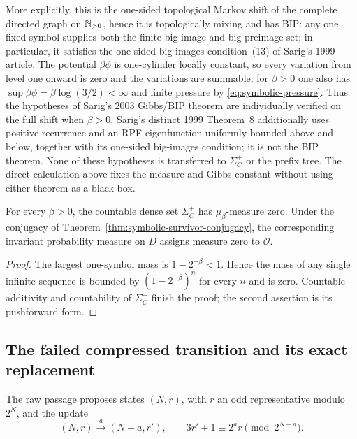 More explicitly, this is the one-sided topological Markov shift of the
complete directed graph on $\mathbb{N}_{>0}$, hence it is topologically mixing and has
BIP: any one fixed symbol supplies both the finite big-image and big-preimage
set; in particular, it satisfies the one-sided big-images condition~(13) of
Sarig's 1999 article.  The potential $\beta\phi$ is one-cylinder locally constant, so every
variation from level one onward is zero and the variations are summable; for
$\beta>0$ one also has
$\sup\beta\phi=\beta\log(3/2)<\infty$ and finite pressure by
\eqref{eq:symbolic-pressure}.  Thus the hypotheses of Sarig's 2003 Gibbs/BIP
theorem \cite{Sarig2003} are individually verified on the full shift when
$\beta>0$.  Sarig's distinct 1999 Theorem~8 \cite{Sarig1999} additionally
uses positive recurrence and an RPF eigenfunction uniformly bounded above
and below, together with its one-sided big-images condition; it is not the
BIP theorem.  None of these hypotheses is transferred to $\Sigma_C^+$ or the
prefix tree.  The direct calculation above fixes the measure and Gibbs
constant without using either theorem as a black box.

\begin{corollary}
\label{cor:symbolic-positive-image-null}
For every $\beta>0$, the countable dense set $\Sigma_C^+$ has
$\mu_\beta$-measure zero.  Under the conjugacy of
Theorem~\ref{thm:symbolic-survivor-conjugacy}, the corresponding invariant
probability measure on $D$ assigns measure zero to $\mathcal O$.
\end{corollary}

\begin{proof}
The largest one-symbol mass is $1-2^{-\beta}<1$.  Hence the mass of any
single infinite sequence is bounded by $(1-2^{-\beta})^n$ for every $n$ and
is zero.  Countable additivity and countability of $\Sigma_C^+$ finish the
proof; the second assertion is its pushforward form.
\end{proof}

\subsection{The failed compressed transition and its exact replacement}

The raw passage proposes states $(N,r)$, with $r$ an odd representative
modulo $2^N$, and the update
\begin{equation}
\label{eq:symbolic-raw-transducer-update}
 (N,r)\xrightarrow{a}(N+a,r'),
 \qquad
 3r'+1\equiv2^ar\pmod{2^{N+a}}.
\end{equation}

